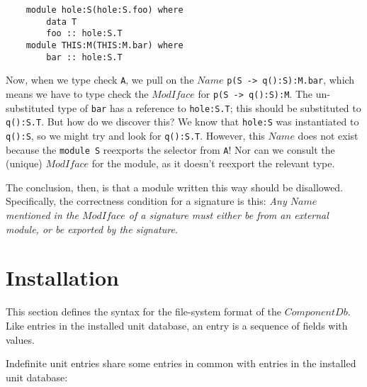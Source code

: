 \documentclass{article}
\newcommand{\I}[1]{\ensuremath{\mathit{#1}}}
\begin{document}
\begin{verbatim}
    module hole:S(hole:S.foo) where
        data T
        foo :: hole:S.T
    module THIS:M(THIS:M.bar) where
        bar :: hole:S.T
\end{verbatim}
%
Now, when we type check \verb|A|, we pull on the \I{Name} \verb|p(S -> q():S):M.bar|,
which means we have to type check the \I{ModIface} for \verb|p(S -> q():S):M|.
The un-substituted type of \verb|bar| has a reference to \verb|hole:S.T|;
this should be substituted to \verb|q():S.T|.  But how do we discover this?
We know that \verb|hole:S| was instantiated to \verb|q():S|, so we might try
and look for \verb|q():S.T|.  However, this \I{Name} does not exist because
the \verb|module S| reexports the selector from \verb|A|!  Nor can we consult
the (unique) \I{ModIface} for the module, as it doesn't reexport the relevant
type.

The conclusion, then, is that a module written this way should be disallowed.
Specifically, the correctness condition for a signature is this: \emph{Any \I{Name}
mentioned in the \I{ModIface} of a signature must either be from an external module, or be
exported by the signature}.

\newpage
\section{Installation}

This section defines the syntax for the file-system format of the \I{ComponentDb}.
Like entries in the installed unit database, an entry is a sequence of fields
with values.

Indefinite unit entries share some entries in common with entries in the installed
unit database:
\end{document}
